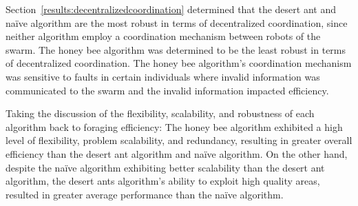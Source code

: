 Section~\ref{results:decentralizedcoordination} determined that the desert ant and na\"ive algorithm are the most robust in terms of decentralized coordination, since neither algorithm employ a coordination mechanism between robots of the swarm. The honey bee algorithm was determined to be the least robust in terms of decentralized coordination. The honey bee algorithm's coordination mechanism was sensitive to faults in certain individuals where invalid information was communicated to the swarm and the invalid information impacted efficiency.

Taking the discussion of the flexibility, scalability, and robustness of each algorithm back to foraging efficiency: The honey bee algorithm exhibited a high level of flexibility, problem scalability, and redundancy, resulting in greater overall efficiency than the desert ant algorithm and na\"ive algorithm. On the other hand, despite the na\"ive algorithm exhibiting better scalability than the desert ant algorithm, the desert ants algorithm's ability to exploit high quality areas, resulted in greater average performance than the na\"ive algorithm.


